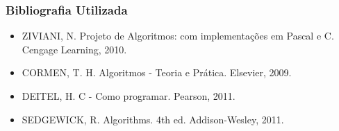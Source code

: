 \documentclass[aspectratio=169]{beamer}
\begin{document}
\begin{frame}
\frametitle{Bibliografia Utilizada}
\begin{itemize}
 \item ZIVIANI, N. Projeto de Algoritmos: com implementações em Pascal e C.
Cengage Learning, 2010.
 \item CORMEN, T. H. Algoritmos - Teoria e Prática. Elsevier, 2009.
 \item DEITEL, H. C - Como programar. Pearson, 2011.
 \item SEDGEWICK, R. Algorithms. 4th ed. Addison-Wesley, 2011.
\end{itemize}
\end{frame}


\begin{frame}[plain]
  \titlepage
\end{frame}
\end{document}
